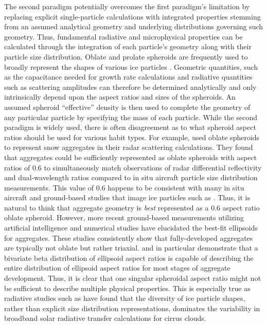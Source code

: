 \documentclass[amt, manuscript]{copernicus}
\begin{document}
The second paradigm potentially overcomes the first paradigm's limitation by replacing explicit single-particle calculations with integrated properties stemming from an assumed analytical geometry and underlying distributions governing such geometry. Thus, fundamental radiative and microphysical properties can be calculated through the integration of each particle's geometry along with their particle size distribution. Oblate and prolate spheroids are frequently used to broadly represent the shapes of various ice particles \citep[e.g.,][]{Jensen2017,Tsai2020}. Geometric quantities, such as the capacitance needed for growth rate calculations \citep{Pruppacher1997,Lambbook} and radiative quantities such as scattering amplitudes \citep{Ryzhkov2011} can therefore be determined analytically and only intrinsically depend upon the aspect ratios and sizes of the spheroids. An assumed spheroid ``effective'' density is then used to complete the geometry of any particular particle by specifying the mass of each particle. While the second paradigm is widely used, there is often disagreement as to what spheroid aspect ratios should be used for various habit types. For example, \citet{Hogan2012} used oblate spheroids to represent snow aggregates in their radar scattering calculations. They found that aggregates could be sufficiently represented as oblate spheroids with aspect ratios of 0.6 to simultaneously match observations of radar differential reflectivity and dual-wavelength ratios compared to in situ aircraft particle size distribution measurements. This value of 0.6 happens to be consistent with many in situ aircraft and ground-based studies that image ice particles such as \citet{Korolev2000,Korolev2003,Garrett2015}. Thus, it is natural to think that aggregate geometry is \textit{best} represented as a 0.6 aspect ratio oblate spheroid. However, more recent ground-based measurements utilizing artificial intelligence \citep{Jiang2019,Dunnavan2019b} and numerical studies \citep{Dunnavan2019b,Przybylo2022,Schrom2023} have elucidated the best-fit ellipsoids for aggregates. These studies consistently show that fully-developed aggregates are typically not oblate but rather triaxial. \citet{Dunnavan2019b} and \citet{Jiang2019} in particular demonstrate that a bivariate beta distribution of ellipsoid aspect ratios is capable of describing the entire distribution of ellipsoid aspect ratios for most stages of aggregate development. Thus, it is clear that one singular spheroidal aspect ratio might not be sufficient to describe multiple physical properties. This is especially true as radiative studies such as \citet{Macke1998} have found that the diversity of ice particle shapes, rather than explicit size distribution representations, dominates the variability in broadband solar radiative transfer calculations for cirrus clouds. 
\end{document}
